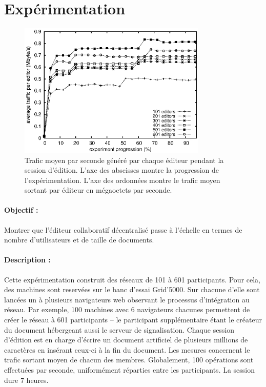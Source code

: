 
\section{Expérimentation}
\label{editor:sec:experimentation}


\begin{figure}
  \begin{center}
    \includegraphics[width=0.8\textwidth]{img/editor/communication.eps}
    \caption[Trafic généré par \CRATE lors de sessions d'édition]
    {\label{editor:img:communication} Trafic moyen par seconde généré par chaque
      éditeur pendant la session d'édition. L'axe des abscisses montre la
      progression de l'expérimentation. L'axe des ordonnées montre le trafic
      moyen sortant par éditeur en mégaoctets par seconde.}
  \end{center}
\end{figure}

\paragraph{Objectif :} Montrer que l'éditeur collaboratif décentralisé \CRATE
passe à l'échelle en termes de nombre d'utilisateurs et de taille de
documents.

\paragraph{Description :} Cette expérimentation construit des réseaux de 101 à
601 participants. Pour cela, des machines sont reservées sur le banc d'essai
Grid'5000. Sur chacune d'elle sont lancées un à plusieurs navigateurs web
observant le processus d'intégration au réseau. Par exemple, 100 machines avec 6
navigateurs chacunes permettent de créer le réseau à 601 participants -- le
participant supplémentaire étant le créateur du document hébergeant aussi le
serveur de signalisation.  Chaque session d'édition est en charge d'écrire un
document artificiel de plusieurs millions de caractères en insérant ceux-ci à la
fin du document. Les mesures concernent le trafic sortant moyen de chacun des
membres. Globalement, 100 opérations sont effectuées par seconde, uniformément
réparties entre les participants. La session dure 7 heures.

